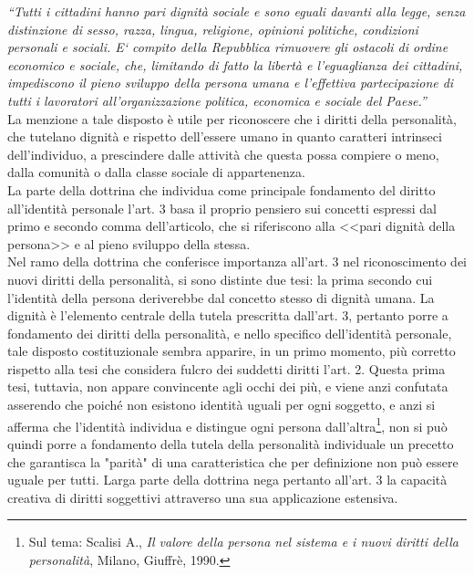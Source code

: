 \textit{“Tutti i cittadini hanno pari dignità sociale e sono eguali davanti alla legge, senza distinzione di sesso, razza, lingua, religione, opinioni politiche, condizioni personali e sociali. E` compito della Repubblica rimuovere gli ostacoli di ordine economico e sociale, che, limitando di fatto la libertà e l'eguaglianza dei cittadini, impediscono il pieno sviluppo della persona umana e l'effettiva partecipazione di tutti i lavoratori all'organizzazione politica, economica e sociale del Paese.”}
\\La menzione a tale disposto è utile per riconoscere che i diritti della personalità, che tutelano dignità e rispetto dell'essere umano in quanto caratteri intrinseci dell'individuo, a prescindere dalle attività che questa possa compiere o meno, dalla comunità o dalla classe sociale di appartenenza.
\\La parte della dottrina che individua come principale fondamento del diritto all'identità personale l'art. 3 basa il proprio pensiero sui concetti espressi dal primo e secondo comma dell’articolo, che si riferiscono alla <<pari dignità della persona>> e al pieno sviluppo della stessa.
\\Nel ramo della dottrina che conferisce importanza all’art. 3 nel riconoscimento dei nuovi diritti della personalità, si sono distinte due tesi: la prima secondo cui l'identità della persona deriverebbe dal concetto stesso di dignità umana. La dignità è l’elemento centrale della tutela prescritta dall’art. 3, pertanto porre a fondamento dei diritti della personalità, e nello specifico dell’identità personale, tale disposto costituzionale sembra apparire, in un primo momento, più corretto rispetto alla tesi che considera fulcro dei suddetti diritti l’art. 2.
Questa prima tesi, tuttavia, non appare convincente agli occhi dei più, e viene anzi confutata asserendo che poiché non esistono identità uguali per ogni soggetto, e anzi si afferma che l'identità individua e distingue ogni persona dall'altra\footnote{Sul tema: Scalisi A., \textit{Il valore della persona nel sistema e i nuovi diritti della personalità}, Milano, Giuffrè, 1990.}, non si può quindi porre a fondamento della tutela della personalità individuale un precetto che garantisca la "parità" di una caratteristica che per definizione non può essere uguale per tutti. Larga parte della dottrina nega pertanto all'art. 3 la capacità creativa di diritti soggettivi attraverso una sua applicazione estensiva.
